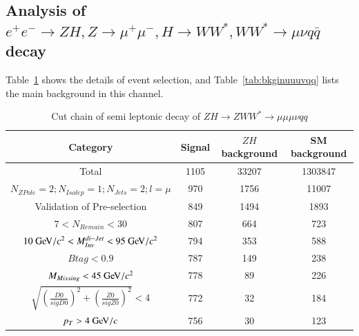 \documentclass[11pt,a4paper]{cepcnote}
\begin{document}
\subsection{Analysis of $e^+e^-\rightarrow ZH, Z\rightarrow \mu^+\mu^-, H\rightarrow WW^*, WW^*\rightarrow \mu\nu q\bar{q}$ decay}
Table~\ref{tab:cutchainuuuvqq} shows the details of event selection, and Table~\ref{tab:bkginuuuvqq} lists the main background in 
this channel.
\begin{table}[H]
  \begin{center}
    \begin{tabular}{cccc}
      \hline \hline
      \multicolumn{1}{c}{Category}&\multicolumn{1}{c}{Signal}&\multicolumn{1}{c}{$ZH$ background}&\multicolumn{1}{c}{SM background}\\ 
      \hline
      Total 	      	 									&   1105	& 33207	& 1303847\\
      $N_{ZPole}=2; N_{Isolep}=1; N_{Jets} =2; l = \mu$		&   970		& 1756	& 11007\\
	  Validation of Pre-selection							&	849		& 1494	& 1893\\
	  $7 < N_{Remain} < 30$									&	807		& 664	& 723	\\
	  $10\gev/c^2 < M_{Inv}^{di-Jet} < 95\gev/c^2 $			&	794		& 353	& 588	\\
	  $Btag < 0.9$											&	787		& 149	& 238	\\
	  $M_{Missing} < 45\gev/c^2$							&   778		&  89	& 226	\\
	  $\sqrt{(\frac{D0}{sigD0})^2+(\frac{Z0}{sigZ0})^2} < 4$&   772   	&  32 	& 184	\\
	  $p_T > 4 \gev/c$										&	756		&  30	& 123	\\
      \hline \hline
    \end{tabular}
  \caption[Monte Carlo purities in the single lepton sample]{%
    Cut chain of semi leptonic decay of $ZH\rightarrow ZWW^* \rightarrow\mu\mu\mu\nu qq$}
  \label{tab:cutchainuuuvqq}
  \end{center}
\end{table}
\end{document}
